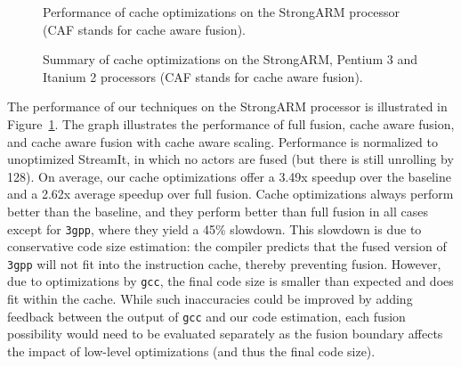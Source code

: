 \begin{figure}[t]
\centering
{}
\caption[Performance of cache optimizations on the StrongARM]{Performance 
of cache optimizations on the StrongARM processor (CAF stands for
cache aware fusion).\protect\label{fig:arm}}
\end{figure}

\begin{figure}[t]
\centering
{}
\caption[Summary of cache optimizations on the StrongARM, Pentium 3 and 
Itanium 2]{Summary of cache optimizations on the StrongARM, Pentium 3
and Itanium 2 processors (CAF stands for cache aware
fusion).\protect\label{fig:p3}}
\end{figure}

The performance of our techniques on the StrongARM processor is
illustrated in Figure~\ref{fig:arm}.  The graph illustrates the
performance of full fusion, cache aware fusion, and cache aware fusion
with cache aware scaling.  Performance is normalized to unoptimized
StreamIt, in which no actors are fused (but there is still unrolling
by 128).  On average, our cache optimizations offer a 3.49x speedup
over the baseline and a 2.62x average speedup over full fusion.  Cache
optimizations always perform better than the baseline, and they
perform better than full fusion in all cases except for \texttt{3gpp},
where they yield a 45\% slowdown.  This slowdown is due to
conservative code size estimation: the compiler predicts that the
fused version of \texttt{3gpp} will not fit into the instruction
cache, thereby preventing fusion.  However, due to optimizations by
{\tt gcc}, the final code size is smaller than expected and does fit
within the cache.  While such inaccuracies could be improved by adding
feedback between the output of {\tt gcc} and our code estimation, each
fusion possibility would need to be evaluated separately as the fusion
boundary affects the impact of low-level optimizations (and thus the
final code size).

